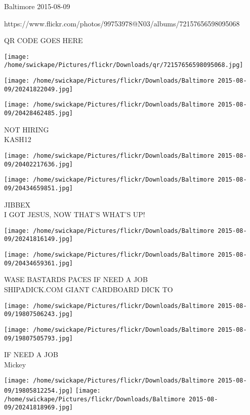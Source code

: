 \documentclass[10pt,letterpaper]{article}
\begin{document}
Baltimore 2015-08-09

https://www.flickr.com/photos/99753978@N03/albums/72157656598095068

QR CODE GOES HERE

\texttt{[image: /home/swickape/Pictures/flickr/Downloads/qr/72157656598095068.jpg]}
\pagebreak

\texttt{[image: /home/swickape/Pictures/flickr/Downloads/Baltimore 2015-08-09/20241822049.jpg]}

\vspace{0.25in}
\texttt{[image: /home/swickape/Pictures/flickr/Downloads/Baltimore 2015-08-09/20428462485.jpg]}

NOT HIRING\\
KASH12\\
\pagebreak

\texttt{[image: /home/swickape/Pictures/flickr/Downloads/Baltimore 2015-08-09/20402217636.jpg]}

\vspace{0.25in}
\texttt{[image: /home/swickape/Pictures/flickr/Downloads/Baltimore 2015-08-09/20434659851.jpg]}

JIBBEX\\
I GOT JESUS, NOW THAT'S WHAT'S UP!\\
\pagebreak

\texttt{[image: /home/swickape/Pictures/flickr/Downloads/Baltimore 2015-08-09/20241816149.jpg]}

\vspace{0.25in}
\texttt{[image: /home/swickape/Pictures/flickr/Downloads/Baltimore 2015-08-09/20434659361.jpg]}

WASE BASTARDS PACES IF NEED A JOB\\
SHIPADICK.COM GIANT CARDBOARD DICK TO\\
\pagebreak

\texttt{[image: /home/swickape/Pictures/flickr/Downloads/Baltimore 2015-08-09/19807506243.jpg]}

\vspace{0.25in}
\texttt{[image: /home/swickape/Pictures/flickr/Downloads/Baltimore 2015-08-09/19807505793.jpg]}

IF NEED A JOB\\
Mickey\\
\pagebreak

\texttt{[image: /home/swickape/Pictures/flickr/Downloads/Baltimore 2015-08-09/19805812254.jpg]}
\texttt{[image: /home/swickape/Pictures/flickr/Downloads/Baltimore 2015-08-09/20241818969.jpg]}
\end{document}
